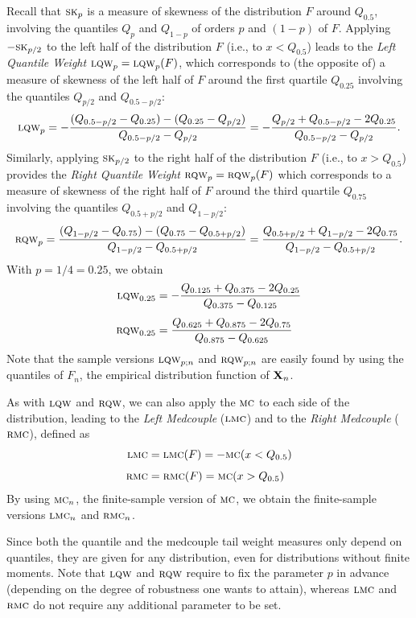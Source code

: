 Recall that $\stsc{SK}_p$ is a measure of skewness of the distribution $F$
around $Q_{0.5}$, involving the quantiles $Q_p$ and $Q_{1-p}$ of orders $p$
and $(1-p)$ of $F$. Applying $-\stsc{SK}_{p/2}$ to the left half of the
distribution $F$ (i.e., to $x<Q_{0.5}$) leads to the \emph{Left Quantile
Weight} $\stsc{LQW}_p = \stsc{LQW}_p(F)$, which corresponds to (the
opposite of) a measure of skewness of the left half of $F$ around the first
quartile $Q_{0.25}$ involving the quantiles $Q_{p/2}$ and $Q_{0.5-p/2}$:
\[
    \stsc{LQW}_p 
    = -\frac{(Q_{0.5-p/2} - Q_{0.25}) - (Q_{0.25} - Q_{p/2})}{Q_{0.5-p/2}-Q_{p/2}}
    = -\frac{Q_{p/2}  +Q_{0.5-p/2} - 2 Q_{0.25}}{Q_{0.5-p/2} - Q_{p/2}}.
\]
Similarly, applying $\stsc{SK}_{p/2}$ to the right half of the distribution
$F$ (i.e., to $x>Q_{0.5}$) provides the \emph{Right Quantile Weight}
$\stsc{RQW}_p = \stsc{RQW}_p(F)$ which corresponds to a measure of
skewness of the right half of $F$ around the third quartile $Q_{0.75}$
involving the quantiles $Q_{0.5+p/2}$ and $Q_{1-p/2}$:
\[
    \stsc{RQW}_p
    = \frac{(Q_{1-p/2} - Q_{0.75}) - (Q_{0.75} - Q_{0.5+p/2})}{Q_{1-p/2} - Q_{0.5+p/2}}
    = \frac{Q_{0.5+p/2} + Q_{1-p/2} - 2 Q_{0.75}}{Q_{1-p/2} - Q_{0.5+p/2}}.
\]
With $p = 1/4 = 0.25$, we obtain
%
\begin{align*}
    \stsc{LQW}_{0.25} & = -\frac{Q_{0.125} + Q_{0.375} - 2 Q_{0.25}}{Q_{0.375} - Q_{0.125}}\\[1ex]
    \stsc{RQW}_{0.25} & =  \frac{Q_{0.625} + Q_{0.875} - 2 Q_{0.75}}{Q_{0.875} - Q_{0.625}}
\end{align*}
%
Note that the sample versions $\stsc{LQW}_{p;n}$ and $\stsc{RQW}_{p;n}$
are easily found by using the quantiles of $F_n$, the empirical distribution
function of $\mathbf X_n$.

As with $\stsc{LQW}$ and $\stsc{RQW}$, we can also apply the $\stsc{MC}$ to
each side of the distribution, leading to the \emph{Left Medcouple}
($\stsc{LMC}$) and to the \emph{Right Medcouple} ($\stsc{RMC}$), defined
as
%
\begin{align*}
    \stsc{LMC} &=\stsc{LMC}(F) = -\stsc{MC}(x<Q_{0.5})\\[1ex]
    \stsc{RMC} &=\stsc{RMC}(F) = \stsc{MC}(x>Q_{0.5})
\end{align*}
%
By using $\stsc{MC}_n$, the finite-sample version of $\stsc{MC}$, we
obtain the finite-sample versions $\stsc{LMC}_n$ and $\stsc{RMC}_n$.

Since both the quantile and the medcouple tail weight measures only depend on
quantiles, they are given for any distribution, even for distributions without
finite moments. Note that $\stsc{LQW}$ and $\stsc{RQW}$ require to fix the
parameter $p$ in advance (depending on the degree of robustness one wants to
attain), whereas $\stsc{LMC}$ and $\stsc{RMC}$ do not require any
additional parameter to be set.

